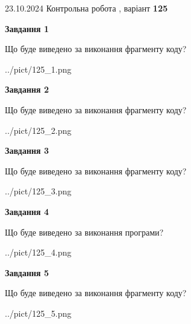 \documentclass[12pt, ukrainian]{article}
\begin{document}
{\Large{23.10.2024 Контрольна робота , варіант  \No \textbf { 125 }\par}}
{
\begin {large}
{\begin {center}\textbf{Завдання 1}\end {center}}

Що буде виведено за виконання фрагменту коду?\par
\begin{center}
	{../pict/125_1.png}
\end{center}
\newpage

{\begin {center}\textbf{Завдання 2}\end {center}}

Що буде виведено за виконання фрагменту коду?\par
\begin{center}
	{../pict/125_2.png}
\end{center}
\newpage

{\begin {center}\textbf{Завдання 3}\end {center}}

Що буде виведено за виконання фрагменту коду?\par
\begin{center}
	{../pict/125_3.png}
\end{center}
\newpage

{\begin {center}\textbf{Завдання 4}\end {center}}

Що буде виведено за виконання програми?\par
\begin{center}
	{../pict/125_4.png}
\end{center}
\newpage

{\begin {center}\textbf{Завдання 5}\end {center}}

Що буде виведено за виконання фрагменту коду?\par
\begin{center}
	{../pict/125_5.png}
\end{center}
\newpage


\end{large}}
\end{document}
